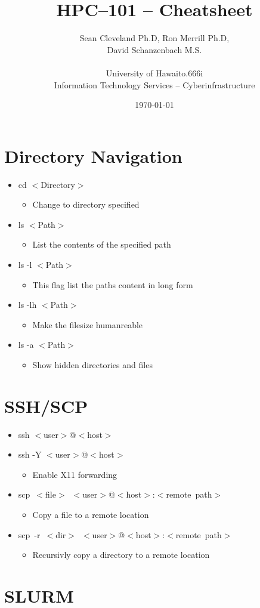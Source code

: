 \documentclass[11pt,twocolumn]{article}
\newcommand{\lft}{$<$}
\newcommand{\rht}{$>$}
\newcommand{\pth}[1]{{\lft}#1{\rht}}
\newlength{\okinalen}
\newcommand{\okina}{\hbox to.666\okinalen{\hss`\hss}}
\newcommand{\hawaii}{Hawai{\okina}i}
\newcommand{\ci}{Cyberinfrastructure}
\newcommand{\desc}[1]{\small \begin{itemize}\item[]#1\end{itemize}}
\begin{document}
\setlength{\droptitle}{-10em}
\title{HPC--101 -- Cheatsheet \vspace{-2ex}}
\date{\today}
\author{Sean Cleveland Ph.D, Ron Merrill Ph.D,\\David Schanzenbach M.S.\\~\\University of {\hawaii}\\Information Technology Services -- {\ci}}
\maketitle
\section{Directory Navigation}
\begin{itemize}
\item[] cd {\pth{Directory}}\desc{Change to directory specified}
\item[] ls {\pth{Path}}\desc{List the contents of the specified path}
\item[] ls -l {\pth{Path}}\desc{This flag list the paths content in long form}
\item[] ls -lh {\pth{Path}}\desc{Make the filesize humanreable}
\item[] ls -a {\pth{Path}}\desc{Show hidden directories and files}
\end{itemize}

\section{SSH/SCP}
\begin{itemize}
\item ssh {\lft}user{\rht}@{\lft}host{\rht}
\item ssh -Y {\lft}user{\rht}@{\lft}host{\rht}\desc{Enable X11 forwarding}
\item scp~{\lft}file{\rht}~{\lft}user{\rht}@{\lft}host{\rht}:{\lft}remote~path{\rht}\desc{Copy a file to a remote location}
\item scp~-r~{\lft}dir{\rht}~{\lft}user{\rht}@{\lft}host{\rht}:{\lft}remote~path{\rht}\desc{Recursivly copy a directory to a remote location}
\end{itemize}

\section{SLURM}
\end{document}
